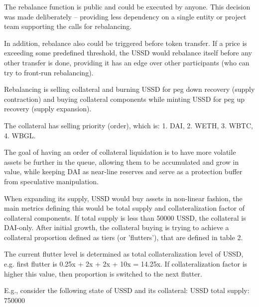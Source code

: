The rebalance function is public and could be executed by anyone. This decision was 
made deliberately – providing less dependency on a single entity or project team 
supporting the calls for rebalancing.

In addition, rebalance also could be triggered before token transfer. If a price is 
exceeding some predefined threshold, the USSD would rebalance itself before any other 
transfer is done, providing it has an edge over other participants (who can try to 
front-run rebalancing).

Rebalancing is selling collateral and burning USSD for peg down recovery (supply 
contraction) and buying collateral components while minting USSD for peg up recovery 
(supply expansion).

The collateral has selling priority (order), which is:
1. DAI, 2. WETH, 3. WBTC, 4. WBGL. 

The goal of having an order of collateral liquidation is to have more volatile assets 
be further in the queue, allowing them to be accumulated and grow in value, while keeping 
DAI as near-line reserves and serve as a protection buffer from speculative manipulation.

When expanding its supply, USSD would buy assets in non-linear fashion, the main metrics 
defining this would be total supply and collateralization factor of collateral components. 
If total supply is less than 50000 USSD, the collateral is DAI-only. After initial growth, 
the collateral buying is trying to achieve a collateral proportion defined as tiers (or 
'flutters'), that are defined in table 2.

The current flutter level is determined as total collateralization level of USSD, e.g. 
first flutter is 0.25x + 2x + 2x + 10x = 14.25x. If collateralization factor is higher 
this value, then proportion is switched to the next flutter.

E.g., consider the following state of USSD and its collateral:
USSD total supply: 750000

